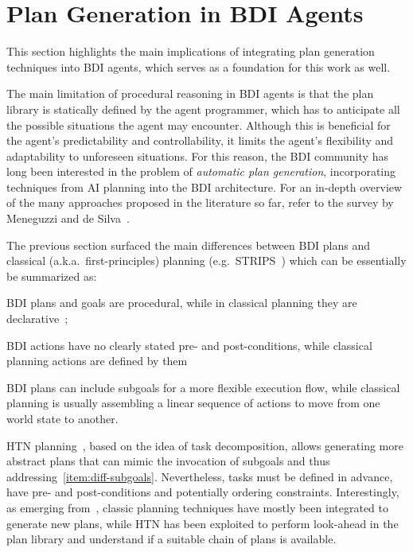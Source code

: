 \documentclass[12pt,a4paper,openright,twoside]{book}
\begin{document}
\section{Plan Generation in BDI Agents}\label{sec:plan-generation}

This section highlights the main implications of integrating plan generation techniques into \ac{BDI} agents, which serves as a foundation for this work as well.

The main limitation of procedural reasoning in \ac{BDI} agents is that the plan library is statically defined by the agent programmer, which has to anticipate all the possible situations the agent may encounter.
%
Although this is beneficial for the agent's predictability and controllability, it limits the agent's flexibility and adaptability to unforeseen situations.
%
For this reason, the \ac{BDI} community has long been interested in the problem of \emph{automatic plan generation}, incorporating techniques from \ac{AI} planning into the \ac{BDI} architecture.
%
For an in-depth overview of the many approaches proposed in the literature so far, refer to the survey by Meneguzzi and de Silva~\cite{MeneguzziS15}.

The previous section surfaced the main differences between \ac{BDI} plans and classical (a.k.a.\ first-principles) planning (e.g.\, STRIPS~\cite{fikes1971ai}) which can be essentially be summarized as:
%
\begin{inlinelist}
    \item \ac{BDI} plans and goals are procedural, while in classical planning they are declarative~\cite{winikoff2002kr};
    \item \ac{BDI} actions have no clearly stated pre- and post-conditions, while classical planning actions are defined by them
    \item\label{item:diff-subgoals} \ac{BDI} plans can include subgoals for a more flexible execution flow, while classical planning is usually assembling a linear sequence of actions to move from one world state to another.
\end{inlinelist}
%
\ac{HTN} planning~\cite{georgievski2015ai}, based on the idea of task decomposition, allows generating more abstract plans that can mimic the invocation of subgoals and thus addressing~\cref{item:diff-subgoals}.
%
Nevertheless, tasks must be defined in advance, have pre- and post-conditions and potentially ordering constraints.
%
Interestingly, as emerging from~\cite{MeneguzziS15}, classic planning techniques have mostly been integrated to generate new plans, while \ac{HTN} has been exploited to perform look-ahead in the plan library and understand if a suitable chain of plans is available.
\end{document}
